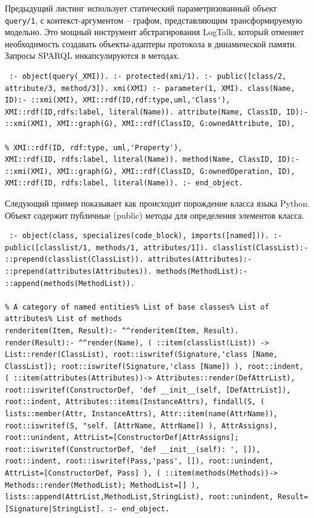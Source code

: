 \documentclass[conference]{IEEEtran} \IEEEoverridecommandlockouts
\begin{document}
Предыдущий листинг использует статический параметризованный объект \verb|query/1|, с контекст-аргументом -- графом, представляющим трансформируемую модельно. Это мощный инструмент абстрагирования LogTalk, который отменяет необходимость создавать объекты-адаптеры протокола в динамической памяти. Запросы SPARQL инкапсулируются в методах. 

\begin{verbatim} :- object(query(_XMI)). :- protected(xmi/1). :- public([class/2, attribute/3, method/3]). xmi(XMI) :- parameter(1, XMI). class(Name, ID):- ::xmi(XMI), XMI::rdf(ID,rdf:type,uml,'Class'), XMI::rdf(ID,rdfs:label, literal(Name)). attribute(Name, ClassID, ID):- ::xmi(XMI), XMI::graph(G), XMI::rdf(ClassID, G:ownedAttribute, ID), 

% XMI::rdf(ID, rdf:type, uml,'Property'),
XMI::rdf(ID, rdfs:label, literal(Name)). method(Name, ClassID, ID):- ::xmi(XMI), XMI::graph(G), XMI::rdf(ClassID, G:ownedOperation, ID), XMI::rdf(ID, rdfs:label, literal(Name)). :- end_object. \end{verbatim} 

Следующий пример показывает как происходит порождение класса языка Python. Объект содержит публичные (public) методы для определения элементов класса. 

\begin{verbatim} :- object(class, specializes(code_block), imports([named])). :- public([classlist/1, methods/1, attributes/1]). classlist(ClassList):- ::prepend(classlist(ClassList)). attributes(Attributes):- ::prepend(attributes(Attributes)). methods(MethodList):- ::append(methods(MethodList)). 

% A category of named entities% List of base classes% List of attributes% List of methods
renderitem(Item, Result):- ^^renderitem(Item, Result). render(Result):- ^^render(Name), ( ::item(classlist(List)) -> List::render(ClassList), root::iswritef(Signature,'class [Name, ClassList]); root::iswritef(Signature,'class [Name]) ), root::indent, ( ::item(attributes(Attributes))-> Attributes::render(DefAttrList), root::iswritef(ConstructorDef, 'def __init__(self, [DefAttrList]), root::indent, Attributes::items(InstanceAttrs), findall(S, ( lists::member(Attr, InstanceAttrs), Attr::item(name(AttrName)), root::iswritef(S, "self. [AttrName, AttrName]) ), AttrAssigns), root::unindent, AttrList=[ConstructorDef|AttrAssigns]; root::iswritef(ConstructorDef, 'def __init__(self): ', []), root::indent, root::iswritef(Pass,'pass', []), root::unindent, AttrList=[ConstructorDef, Pass] ), ( ::item(methods(Methods))-> Methods::render(MethodList); MethodList=[] ), lists::append(AttrList,MethodList,StringList), root::unindent, Result=[Signature|StringList]. :- end_object. \end{verbatim} 
\end{document}

